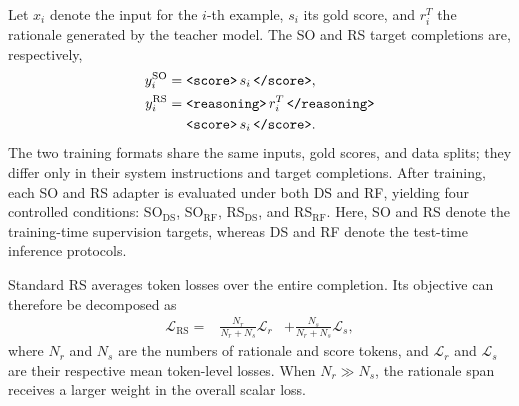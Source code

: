 Let \(x_i\) denote the input for the \(i\)-th example, \(s_i\) its gold
score, and \(r_i^T\) the rationale generated by the teacher model. The
SO and RS target completions are, respectively,
\[
\begin{aligned}
y_i^{\mathrm{SO}} ={}&
\texttt{\textless score\textgreater}\,s_i\,
\texttt{\textless/score\textgreater}, \\
y_i^{\mathrm{RS}} ={}&
\texttt{\textless reasoning\textgreater}\,r_i^T\,
\texttt{\textless/reasoning\textgreater} \\
&\texttt{\textless score\textgreater}\,s_i\,
\texttt{\textless/score\textgreater}.
\end{aligned}
\]
The two training formats share the same inputs, gold scores, and data
splits; they differ only in their system instructions and target
completions. After training, each SO and RS adapter is evaluated under both DS and
RF, yielding four controlled conditions: SO\(_{\mathrm{DS}}\),
SO\(_{\mathrm{RF}}\), RS\(_{\mathrm{DS}}\), and
RS\(_{\mathrm{RF}}\). Here, SO and RS denote the training-time
supervision targets, whereas DS and RF denote the test-time inference
protocols.


Standard RS averages token losses over the entire completion.
Its objective can therefore be decomposed as
\[
\begin{aligned}
\mathcal{L}_{\mathrm{RS}}
={}&
\frac{N_r}{N_r+N_s}\mathcal{L}_r
&+
\frac{N_s}{N_r+N_s}\mathcal{L}_s ,
\end{aligned}
\]
where \(N_r\) and \(N_s\) are the numbers of rationale and score
tokens, and \(\mathcal{L}_r\) and \(\mathcal{L}_s\) are their
respective mean token-level losses. When \(N_r \gg N_s\), the
rationale span receives a larger weight in the overall scalar loss.



